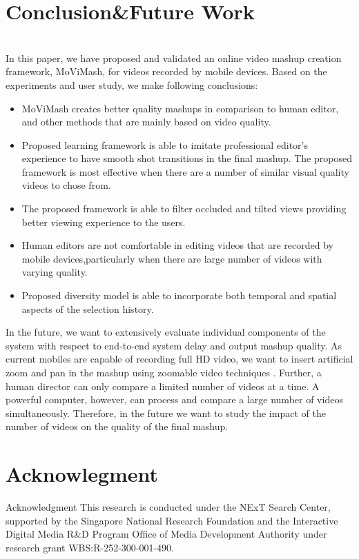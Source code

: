 \documentclass{sig-alternate}
\providecommand{\DIFadd}[1]{{\protect\color{blue}\uwave{#1}}} %
\providecommand{\DIFaddbegin}{} %
\providecommand{\DIFaddend}{} %
\newcommand{\DIFaddincludegraphics}[2][]{{\color{blue}\fbox{\DIFOincludegraphics[#1]{#2}}}} %
\DeclareRobustCommand{\DIFaddbegin}{\DIFOaddbegin \let\includegraphics\DIFaddincludegraphics} %
\DeclareRobustCommand{\DIFaddend}{\DIFOaddend \let\includegraphics\DIFOincludegraphics} %
\begin{document}
\section{Conclusion\&Future Work}
\DIFaddbegin 

\DIFadd{You are right at the place. Nothing is changed.}\\
\DIFaddend In this paper, we have proposed and validated an online video mashup creation framework, MoViMash, for videos recorded by mobile devices. Based on the experiments and user study, we make following conclusions: 
\begin{itemize}
\item MoViMash creates better quality mashups in comparison to human editor, and other methods that are mainly based on video quality.
 \item Proposed learning framework is able to imitate professional editor’s experience to have smooth shot transitions in the ﬁnal mashup. The proposed framework is most effective when there are a number of similar visual quality videos to chose from. 
\item The proposed framework is able to ﬁlter occluded and tilted views providing better viewing experience to the users. 
\item Human editors are not comfortable in editing videos that are recorded by mobile devices,particularly when there are large number of videos with varying quality. 
\item Proposed diversity model is able to incorporate both temporal and spatial aspects of the selection history.
\end{itemize}
In the future, we want to extensively evaluate individual components of the system with respect to end-to-end system delay and output mashup quality. As current mobiles are capable of recording full HD video, we want to insert artiﬁcial zoom and pan in the mashup using zoomable video techniques \cite{economou1983green}. Further, a human director can only compare a limited number of videos at a time. A powerful computer, however, can process and compare a large number of videos simultaneously. Therefore, in the future we want to study the impact of the number of videos on \cite{cabrera2001path} the quality of the ﬁnal mashup.
\section*{Acknowlegment}
Acknowledgment This research is conducted under the NExT Search Center, supported by the Singapore National Research Foundation and the Interactive \cite{carter2007ceramic} Digital Media R\&D Program Ofﬁce of Media Development Authority under research grant WBS:R-252-300-001-490.



\end{document}
